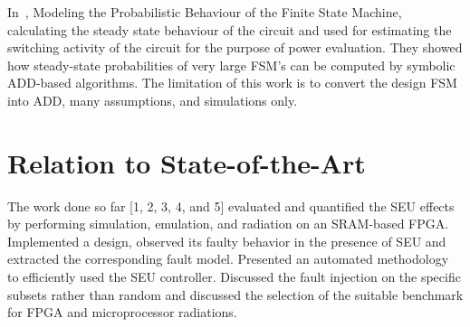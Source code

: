 In~\cite{hachtel1996markovian}, Modeling the Probabilistic Behaviour of the Finite State Machine, calculating the steady state
behaviour of the circuit and used for estimating the switching activity of the circuit for the purpose of
power evaluation. They showed how steady-state probabilities of very large FSM’s can be computed by
symbolic ADD-based algorithms. The limitation of this work is to convert the design FSM into ADD, many assumptions, and simulations only.









\label{related}
\section{Relation to State-of-the-Art}
The work done so far [1, 2, 3, 4, and 5] evaluated and quantified the SEU effects by performing simulation, emulation, and radiation on an SRAM-based FPGA. Implemented a design, observed its faulty behavior in the presence of SEU and extracted the corresponding fault model. Presented an automated methodology to efficiently used the SEU controller. Discussed the fault injection on the specific subsets rather than random and discussed the selection of the suitable benchmark for FPGA and microprocessor radiations. 




